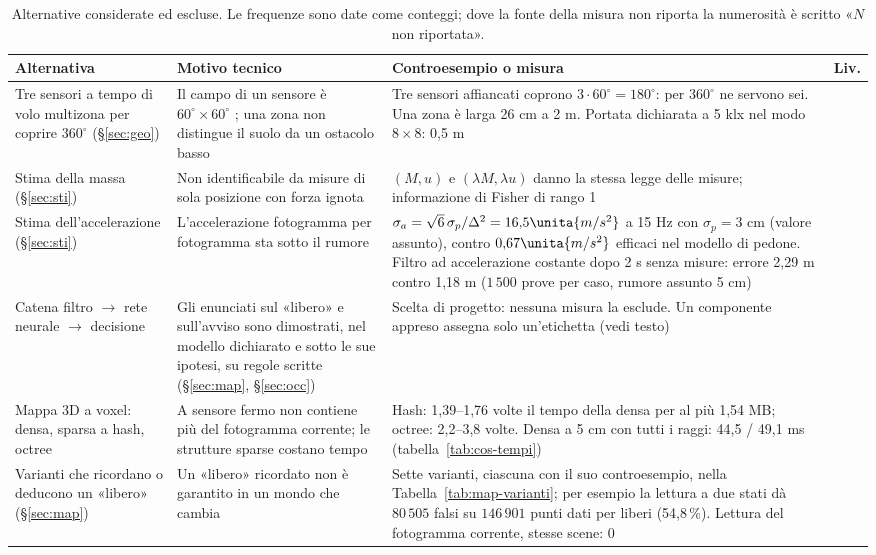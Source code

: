 \begin{table}[H]\centering\footnotesize
\caption{Alternative considerate ed escluse. Le frequenze sono date come conteggi; dove la fonte della misura non riporta la numerosità è scritto «$N$ non riportata».}\label{tab:cos-alternative}
\begin{tabularx}{\textwidth}{@{}>{\RaggedRight\arraybackslash}p{3.3cm}>{\RaggedRight\arraybackslash}p{4.4cm}Lc@{}}\toprule
Alternativa & Motivo tecnico & Controesempio o misura & Liv.\\\midrule
Tre sensori a tempo di volo multizona per coprire $360^\circ$ (\S\ref{sec:geo}) & Il campo di un sensore è $60^\circ\times60^\circ$ \cite{st-vl53l7cx}; una zona non distingue il suolo da un ostacolo basso & Tre sensori affiancati coprono $3\cdot60^\circ=180^\circ$: per $360^\circ$ ne servono sei. Una zona è larga 26 cm a 2 m. Portata dichiarata a 5 klx nel modo $8\times8$: 0,5 m \cite{st-vl53l7cx} & \\
Stima della massa (\S\ref{sec:sti}) & Non identificabile da misure di sola posizione con forza ignota & $(M,u)$ e $(\lambda M,\lambda u)$ danno la stessa legge delle misure; informazione di Fisher di rango 1 & \\
Stima dell'accelerazione (\S\ref{sec:sti}) & L'accelerazione fotogramma per fotogramma sta sotto il rumore & $\sigma_a=\sqrt6\,\sigma_p/\Delta^2=16{,}5\unita{m/s^2}$ a 15 Hz con $\sigma_p=3$ cm (valore assunto), contro $0{,}67\unita{m/s^2}$ efficaci nel modello di pedone. Filtro ad accelerazione costante dopo 2 s senza misure: errore 2,29 m contro 1,18 m ($1\,500$ prove per caso, rumore assunto 5 cm) &  \\
Catena filtro $\to$ rete neurale $\to$ decisione & Gli enunciati sul «libero» e sull'avviso sono dimostrati, nel modello dichiarato e sotto le sue ipotesi, su regole scritte (\S\ref{sec:map}, \S\ref{sec:occ}) & Scelta di progetto: nessuna misura la esclude. Un componente appreso assegna solo un'etichetta (vedi testo) & \\
Mappa 3D a voxel: densa, sparsa a hash, octree & A sensore fermo non contiene più del fotogramma corrente; le strutture sparse costano tempo & Hash: 1,39--1,76 volte il tempo della densa per al più 1,54 MB; octree: 2,2--3,8 volte. Densa a 5 cm con tutti i raggi: 44,5 / 49,1 ms (tabella~\ref{tab:cos-tempi}) & \\
Varianti che ricordano o deducono un «libero» (\S\ref{sec:map}) & Un «libero» ricordato non è garantito in un mondo che cambia & Sette varianti, ciascuna con il suo controesempio, nella Tabella~\ref{tab:map-varianti}; per esempio la lettura a due stati dà $80\,505$ falsi su $146\,901$ punti dati per liberi (54,8\,\%). Lettura del fotogramma corrente, stesse scene: 0 & \\

\end{tabularx}
\end{table}
